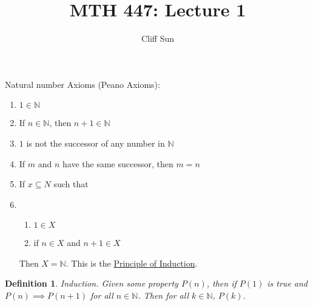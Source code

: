 \documentclass{article}
\title{MTH 447: Lecture 1}
\author{Cliff Sun}
\newtheorem{definition}[theorem]{Definition}
\newtheorem{one minute paper}[theorem]{One Minute Paper}
\begin{document}
\maketitle

Natural number Axioms (Peano Axioms):
\begin{enumerate}
    \item $1 \in \mathbb{N}$
    \item If $n \in \mathbb{N}$, then $n+1 \in \mathbb{N}$
    \item $1$ is not the successor of any number in $\mathbb{N}$
    \item If $m$ and $n$ have the same successor, then $m = n$
    \item If $x \subseteq N$ such that 
    \item \begin{enumerate}
        \item $1 \in X$
        \item if $n \in X$ and $n+1\in X$
    \end{enumerate} 
    Then $X = \mathbb{N}$. This is the \underline{Principle of Induction}. 
\end{enumerate}

\begin{definition}
    Induction. Given some property $P(n)$, then if $P(1)$ is true and $P(n) \implies P(n+1)$ for all $n \in \mathbb{N}$. Then for all $k \in \mathbb{N}$, $P(k)$. 
\end{definition}
\end{document}
